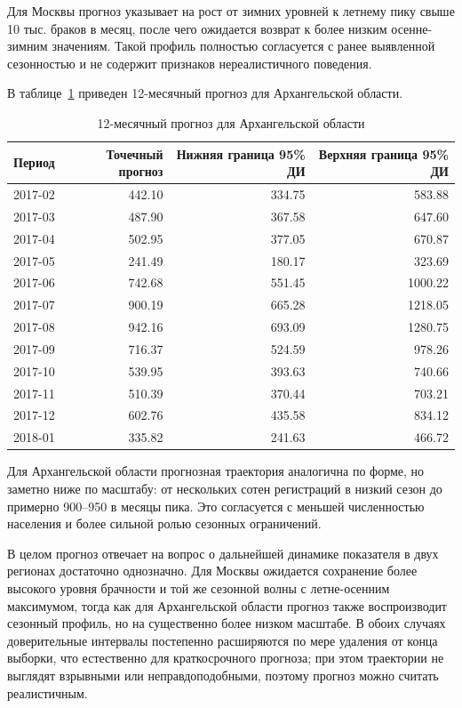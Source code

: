 \documentclass[12pt]{article}
\begin{document}
Для Москвы прогноз указывает на рост от зимних уровней к летнему пику свыше
10 тыс. браков в месяц, после чего ожидается возврат к более низким осенне-зимним
значениям. Такой профиль полностью согласуется с ранее выявленной сезонностью и
не содержит признаков нереалистичного поведения.

В таблице~\ref{tab:forecast_ark} приведен 12-месячный прогноз для Архангельской
области.

\begin{table}[H]
\centering
\caption{12-месячный прогноз для Архангельской области}
\label{tab:forecast_ark}
\small
\begin{tabular}{lrrr}
\toprule
Период & Точечный прогноз & Нижняя граница 95\% ДИ & Верхняя граница 95\% ДИ \\
\midrule
2017-02 & 442.10 & 334.75 & 583.88 \\
2017-03 & 487.90 & 367.58 & 647.60 \\
2017-04 & 502.95 & 377.05 & 670.87 \\
2017-05 & 241.49 & 180.17 & 323.69 \\
2017-06 & 742.68 & 551.45 & 1000.22 \\
2017-07 & 900.19 & 665.28 & 1218.05 \\
2017-08 & 942.16 & 693.09 & 1280.75 \\
2017-09 & 716.37 & 524.59 & 978.26 \\
2017-10 & 539.95 & 393.63 & 740.66 \\
2017-11 & 510.39 & 370.44 & 703.21 \\
2017-12 & 602.76 & 435.58 & 834.12 \\
2018-01 & 335.82 & 241.63 & 466.72 \\
\bottomrule
\end{tabular}
\end{table}

Для Архангельской области прогнозная траектория аналогична по форме, но заметно
ниже по масштабу: от нескольких сотен регистраций в низкий сезон до примерно
900--950 в месяцы пика. Это согласуется с меньшей численностью населения и
более сильной ролью сезонных ограничений.

В целом прогноз отвечает на вопрос о дальнейшей динамике показателя в двух
регионах достаточно однозначно. Для Москвы ожидается сохранение более высокого
уровня брачности и той же сезонной волны с летне-осенним максимумом, тогда как
для Архангельской области прогноз также воспроизводит сезонный профиль, но на
существенно более низком масштабе. В обоих случаях доверительные интервалы
постепенно расширяются по мере удаления от конца выборки, что естественно для
краткосрочного прогноза; при этом траектории не выглядят взрывными или
неправдоподобными, поэтому прогноз можно считать реалистичным.
\end{document}
